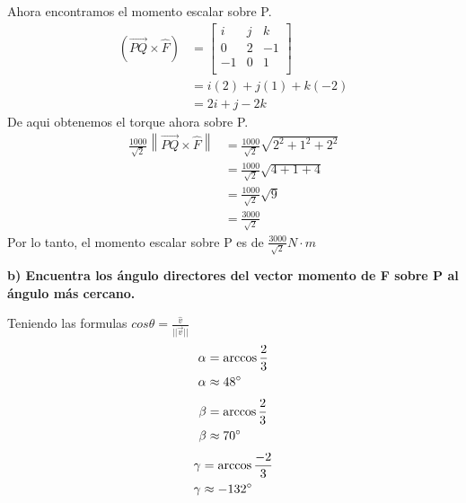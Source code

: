 \documentclass[11pt,letterpaper]{article}
\begin{document}
Ahora encontramos el momento escalar sobre P.
\begin{equation*}
    \begin{split}
        (\overrightarrow{PQ} \times \hat{F}) &=\begin{bmatrix}
            i & j & k \\
            0 & 2 & -1 \\
            -1 & 0 & 1 \\
        \end{bmatrix}\\
        &=i(2)+j(1)+k(-2)\\
        &=2i+j-2k
    \end{split}
\end{equation*}
De aqui obtenemos el torque ahora sobre P.
\begin{equation*}
    \begin{split}
        \frac{1000}{\sqrt{2}}\left\| \overrightarrow{PQ} \times \hat{F} \right\| &= \frac{1000}{\sqrt{2}}\sqrt{2^2+1^2+2^2}\\
        &=\frac{1000}{\sqrt{2}}\sqrt{4+1+4}\\
        &=\frac{1000}{\sqrt{2}}\sqrt{9}\\
        &=\frac{3000}{\sqrt{2}}
    \end{split}
\end{equation*}
Por lo tanto, el momento escalar sobre P es de $\frac{3000}{\sqrt{2}}N\cdot m$


\textbf{b) Encuentra los ángulo directores del vector momento de F sobre P al ángulo más cercano.}

Teniendo las formulas $cos\theta=\frac{\hat{v}}{||\overrightarrow{v}||}$
\begin{equation*}
    \begin{split}
        \alpha &= \arccos{\frac{2}{3}}\\
        \alpha &\approx 48\degree
    \end{split}
\end{equation*}
\begin{equation*}
    \begin{split}
        \beta &= \arccos{\frac{2}{3}}\\
        \beta &\approx 70\degree
    \end{split}
\end{equation*}
\begin{equation*}
    \begin{split}
        \gamma &= \arccos{\frac{-2}{3}}\\
        \gamma &\approx -132\degree
    \end{split}
\end{equation*}
\end{document}
